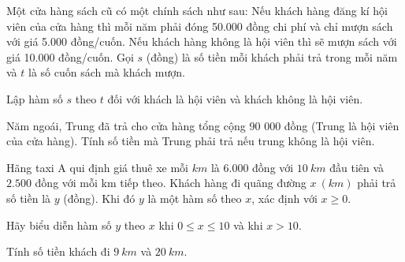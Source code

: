 \begin{bt}%
	Một cửa hàng sách cũ có một chính sách như sau: Nếu khách hàng đăng kí hội viên của cửa hàng thì mỗi năm phải đóng 50.000 đồng chi phí và chỉ mượn sách với giá 5.000 đồng/cuốn. Nếu khách hàng không là hội viên thì sẽ mượn sách với giá 10.000 đồng/cuốn. Gọi $s$ (đồng) là số tiền mỗi khách phải trả trong mỗi năm và $t$ là số cuốn sách mà khách mượn.
	\begin{listEX}[1]
		\item Lập hàm số $s$ theo $t$ đối với khách là hội viên và khách không là hội viên.
		\item Năm ngoái, Trung đã trả cho cửa hàng tổng cộng 90 000 đồng (Trung là hội viên của cửa hàng). Tính số tiền mà Trung phải trả nếu trung không là hội viên.
	\end{listEX}
\end{bt}

\begin{bt}%
	Hãng taxi A qui định giá thuê xe mỗi $km$ là $6.000$ đồng với $10~km$ đầu tiên và $2.500$ đồng với mỗi km tiếp theo. Khách hàng đi quãng đường $x~(km)$ phải trả số tiền là $y$ (đồng). Khi đó $y$ là một hàm số theo $x$, xác định với $x\geq0$.
	\begin{listEX}[1]
		\item Hãy biểu diễn hàm số $y$ theo $x$ khi $0 \leq x \leq 10$ và khi $x>10$.
		\item Tính số tiền khách đi $9~km$ và $20~km$.
	\end{listEX}
\end{bt}

